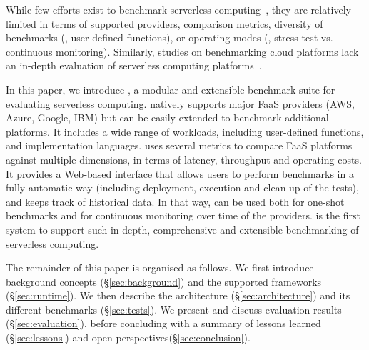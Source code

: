 While few efforts exist to benchmark serverless computing~\cite{doi:10.1002/cpe.4792, Kuntsevich:2018:DAB:3284014.3284016, EoPSCE, 10.1007/978-3-319-75178-8_34}, they are relatively limited in terms of supported providers, comparison metrics, diversity of benchmarks (\eg, user-defined functions), or operating modes (\eg, stress-test vs. continuous monitoring).
Similarly, studies on benchmarking cloud platforms lack an in-depth evaluation of serverless computing platforms~\cite{Gan:2019:OBS:3297858.3304013}. 

In this paper, we introduce \sys, a modular and extensible benchmark suite for evaluating serverless computing.
\sys natively supports major FaaS providers (AWS, Azure, Google, IBM) but can be easily extended to benchmark additional platforms.
It includes a wide range of workloads, including user-defined functions, and implementation languages.
\sys uses several metrics to compare FaaS platforms against multiple dimensions, in terms of latency, throughput and operating costs.
It provides a Web-based interface that allows users to perform benchmarks in a fully automatic way (including deployment, execution and clean-up of the tests), and keeps track of historical data.
In that way, \sys can be used both for one-shot benchmarks and for continuous monitoring over time of the providers.
\sys is the first system to support such in-depth, comprehensive and extensible benchmarking of serverless computing.

The remainder of this paper is organised as follows.
We first introduce background concepts (\S\ref{sec:background}) and the supported frameworks (\S\ref{sec:runtime}).
We then describe the \sys architecture (\S\ref{sec:architecture}) and its different benchmarks (\S\ref{sec:tests}).
We present and discuss evaluation results (\S\ref{sec:evaluation}), before concluding with a summary of lessons learned (\S\ref{sec:lessons}) and open perspectives(\S\ref{sec:conclusion}).

